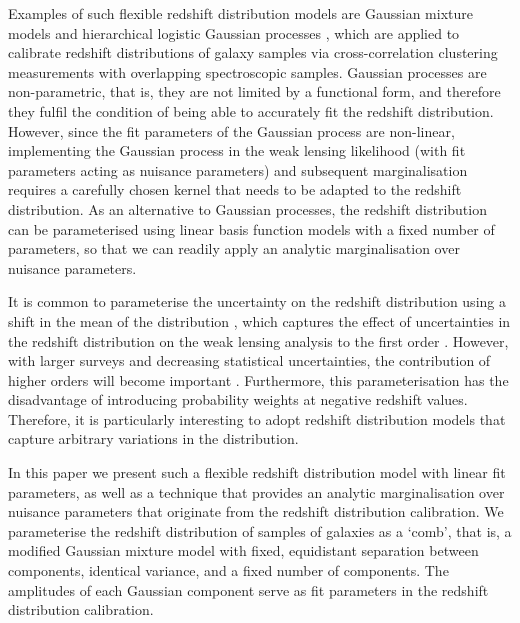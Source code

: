 \documentclass{aa}
\begin{document}
Examples of such flexible redshift distribution models are Gaussian mixture models \citep{hoyle19, leistedt19} and hierarchical logistic Gaussian processes \citep{2020MNRAS.491.4768R}, which are applied to calibrate redshift distributions of galaxy samples via cross-correlation clustering measurements with overlapping spectroscopic samples. Gaussian processes are non-parametric, that is, they are not limited by a functional form, and therefore they fulfil the condition of being able to accurately fit the redshift distribution. However, since the fit parameters of the Gaussian process are non-linear, implementing the Gaussian process in the weak lensing likelihood (with fit parameters acting as nuisance parameters) and subsequent marginalisation requires a carefully chosen kernel that needs to be adapted to the redshift distribution. As an alternative to  Gaussian processes, the redshift distribution can be parameterised using linear basis function models with a fixed number of parameters, so that we can readily apply an analytic marginalisation over nuisance parameters.
 
It is common to parameterise the uncertainty on the redshift distribution using a shift in the mean of the distribution \citep{hildebrandt18, hildebrandt20, HSC2, DES3, hoyle18}, which captures the effect of uncertainties in the redshift distribution on the weak lensing analysis to the first order \citep{amara}. However, with larger surveys and decreasing statistical uncertainties, the contribution of higher orders will become important \citep{wright_som}. Furthermore, this parameterisation has the disadvantage of introducing probability weights at negative redshift values. Therefore, it is particularly interesting to adopt redshift distribution models that capture arbitrary variations in the distribution.

In this paper we present such a flexible redshift distribution model with linear fit parameters, as well as a technique that provides an analytic marginalisation over nuisance parameters that originate from the redshift distribution calibration. We parameterise the redshift distribution of samples of galaxies as a `comb', that is, a modified Gaussian mixture model with fixed, equidistant separation between components, identical variance, and a fixed number of components. The amplitudes of each Gaussian component serve as fit parameters in the redshift distribution calibration. 
\end{document}
